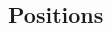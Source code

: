\documentclass[10pt]{article} %
\begin{document}
\begin{paracol}{2}




\section{Positions}





\end{paracol}
\end{document}
